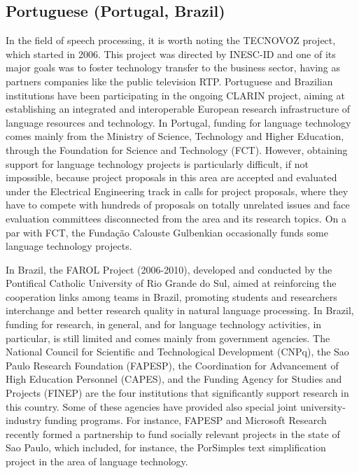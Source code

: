 \documentclass[10pt, plain]{../../metanetpaper}
\begin{document}
\begin{multicols}{2}
\begin{small}
%

\subsection*{Portuguese (Portugal, Brazil)}
\label{sec:port-port-braz}

In the field of speech processing, it is worth noting the TECNOVOZ project, which started in 2006. This project was directed by INESC-ID and one of its major goals was to foster technology transfer to the business sector, having as partners companies like the public television RTP.  Portuguese and Brazilian institutions have been participating in the ongoing CLARIN project, aiming at establishing an integrated and interoperable European research infrastructure of language resources and technology.  In Portugal, funding for language technology comes mainly from the Ministry of Science, Technology and Higher Education, through the Foundation for Science and Technology (FCT). However, obtaining support for language technology projects is particularly difficult, if not impossible, because project proposals in this area are accepted and evaluated under the Electrical Engineering track in calls for project proposals, where they have to compete with hundreds of proposals on totally unrelated issues and face evaluation committees disconnected from the area and its research topics. On a par with FCT, the Fundação Calouste Gulbenkian occasionally funds some language technology projects.

In Brazil, the FAROL Project (2006-2010), developed and conducted by the Pontifical Catholic University of Rio Grande do Sul, aimed at reinforcing the cooperation links among teams in Brazil, promoting students and researchers interchange and better research quality in natural language processing.  In Brazil, funding for research, in general, and for language technology activities, in particular, is still limited and comes mainly from government agencies. The National Council for Scientific and Technological Development (CNPq), the Sao Paulo Research Foundation (FAPESP), the Coordination for Advancement of High Education Personnel (CAPES), and the Funding Agency for Studies and Projects (FINEP) are the four institutions that significantly support research in this country. Some of these agencies have provided also special joint university-industry funding programs. For instance, FAPESP and Microsoft Research recently formed a partnership to fund socially relevant projects in the state of Sao Paulo, which included, for instance, the PorSimples text simplification project in the area of language technology.


\end{small}
\end{multicols}
\end{document}
